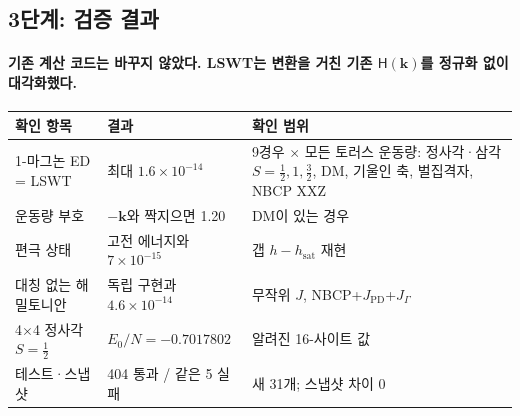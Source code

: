 \subsection{3단계: 검증 결과}\label{stage3-verification}
\begingroup%
  \framesubtitle{기존 계산 코드는 바꾸지 않았다. LSWT는 변환을 거친 기존 $\mathsf H(\mathbf k)$를 정규화 없이 대각화했다.}
  \small
  \begin{tabularx}{\textwidth}{@{}P{3.0cm}P{2.9cm}Y@{}}
    \toprule
    확인 항목 & 결과 & 확인 범위 \\
    -마그논 ED = LSWT & 최대 $1.6\times10^{-14}$ & 9경우 $\times$ 모든 토러스 운동량: 정사각·삼각 $S=\tfrac12,1,\tfrac32$, DM, 기울인 축, 벌집격자, NBCP XXZ \\
    운동량 부호 & $-\mathbf k$와 짝지으면 1.20 & DM이 있는 경우 \\
    편극 상태 & 고전 에너지와 $7\times10^{-15}$ & 갭 $h-h_{\mathrm{sat}}$ 재현 \\
    대칭 없는 해밀토니안 & 독립 구현과 $4.6\times10^{-14}$ & 무작위 $J$, NBCP+$J_{\mathrm{PD}}$+$J_\Gamma$ \\
    4$\times$4 정사각 $S=\tfrac12$ & $E_0/N=-0.7017802$ & 알려진 16-사이트 값 \\
    테스트·스냅샷 & 404 통과 / 같은 5 실패 & 새 31개; 스냅샷 차이 0 \\
    \bottomrule
  \end{tabularx}
  \par\medskip
\endgroup


